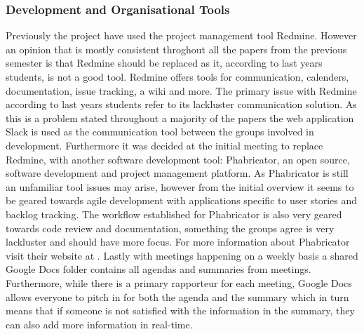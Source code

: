 \subsubsection*{Development and Organisational Tools}
Previously the project have used the project management tool Redmine.
However an opinion that is mostly consistent throghout all the papers from the previous semester is that Redmine should be replaced as it, according to last years students, is not a good tool.
Redmine offers tools for communication, calenders, documentation, issue tracking, a wiki and more.
The primary issue with Redmine according to last years students refer to its lackluster communication solution.
As this is a problem stated throughout a majority of the papers the web application Slack is used as the communication tool between the groups involved in development.
Furthermore it was decided at the initial meeting to replace Redmine, with another software development tool: Phabricator, an open source, software development and project management platform. 
As Phabricator is still an unfamiliar tool issues may arise, however from the initial overview it seems to be geared towards agile development with applications specific to user stories and backlog tracking.
The workflow established for Phabricator is also very geared towards code review and documentation, something the groups agree is very lackluster and should have more focus.
For more information about Phabricator visit their website at \cite{phabricatorWebsite}.
Lastly with meetings happening on a weekly basis a shared Google Docs folder contains all agendas and summaries from meetings.
Furthermore, while there is a primary rapporteur for each meeting, Google Docs allows everyone to pitch in for both the agenda and the summary which in turn means that if someone is not satisfied with the information in the summary, they can also add more information in real-time.
